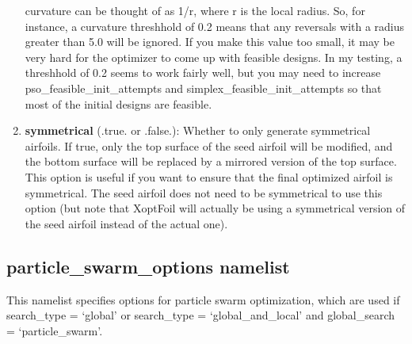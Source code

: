 \documentclass[11pt]{article}
\begin{document}
\begin{enumerate}
{curvature can be thought of as 1/r, where r is the local radius.  So, for instance, a
curvature threshhold of 0.2 means that any reversals with a radius greater than 5.0 will
be ignored.  If you make this value too small, it may be very hard for the optimizer to
come up with feasible designs.  In my testing, a threshhold of 0.2 seems to work fairly
well, but you may need to increase pso\_feasible\_init\_attempts and
simplex\_feasible\_init\_attempts so that most of the initial designs are feasible.}
\item{\textbf{symmetrical} (.true. or .false.): Whether to only generate symmetrical 
airfoils.  If true, only the top surface of the seed airfoil will be modified, and the
bottom surface will be replaced by a mirrored version of the top surface. This option is
useful if you want to ensure that the final optimized airfoil is symmetrical.  The seed 
airfoil does not need
to be symmetrical to use this option (but note that XoptFoil will actually be using a
symmetrical version of the seed airfoil instead of the actual one).}
\end{enumerate}

\subsection{particle\_swarm\_options namelist}

This namelist specifies options for particle swarm optimization, which are used if
search\_type = `global' or search\_type = `global\_and\_local' and global\_search =
`particle\_swarm'.
\end{document}
